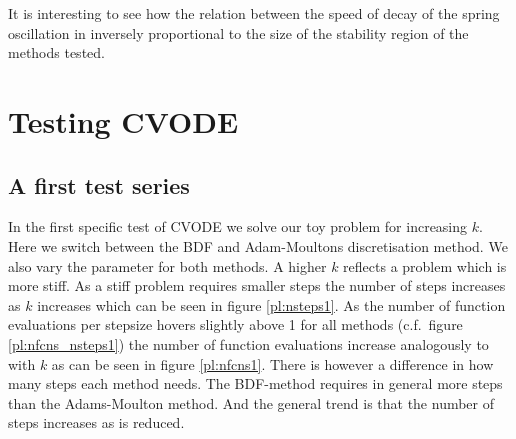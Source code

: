 \documentclass{report}
\begin{document}
It is interesting to see how the relation between the speed of decay of the spring oscillation in inversely proportional to the size of the stability region of the methods tested.


\section*{Testing CVODE}
\subsection*{A first test series}

In the first specific test of CVODE we solve our toy problem for increasing $k$. Here we switch between the BDF and Adam-Moultons discretisation method. We also vary the  parameter for both methods.
A higher $k$ reflects a problem which is more stiff. As a stiff problem requires smaller steps the number of steps  increases as $k$ increases which  can be seen in figure \ref{pl:nsteps1}. As the number of function evaluations per stepsize  hovers slightly above 1 for all methods (c.f.\ figure \ref{pl:nfcns_nsteps1}) the number of function evaluations increase analogously to  with $k$ as can be seen in figure \ref{pl:nfcns1}. There is however a difference in how many steps each method needs. The BDF-method requires in general more steps than the Adams-Moulton method. And the general trend is that the number of steps increases as  is reduced. 
\end{document}
